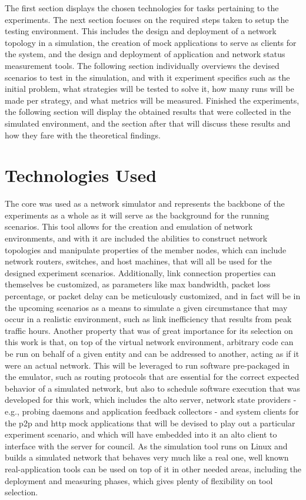     The first section displays the chosen technologies for tasks pertaining to the experiments.
    The next section focuses on the required steps taken to setup the testing environment.
    This includes the design and deployment of a network topology in a simulation, the creation of mock applications to serve as clients for the system, and the design and deployment of application and network status measurement tools.
    The following section individually overviews the devised scenarios to test in the simulation, and with it experiment specifics such as the initial problem, what strategies will be tested to solve it, how many runs will be made per strategy, and what metrics will be measured.
    Finished the experiments, the following section will display the obtained results that were collected in the simulated environment, and the section after that will discuss these results and how they fare with the theoretical findings.

\section{Technologies Used}

    The \gls{core} \cite{core} was used as a network simulator and represents the backbone of the experiments as a whole as it will serve as the background for the running scenarios.
    This tool allows for the creation and emulation of network environments, and with it are included the abilities to construct network topologies and manipulate properties of the member nodes, which can include network routers, switches, and host machines, that will all be used for the designed experiment scenarios.
    Additionally, link connection properties can themselves be customized, as parameters like max bandwidth, packet loss percentage, or packet delay can be meticulously customized, and in fact will be in the upcoming scenarios as a means to simulate a given circumstance that may occur in a realistic environment, such as link inefficiency that results from peak traffic hours.
    Another property that was of great importance for its selection on this work is that, on top of the virtual network environment, arbitrary code can be run on behalf of a given entity and can be addressed to another, acting as if it were an actual network.
    This will be leveraged to run software pre-packaged in the emulator, such as routing protocols that are essential for the correct expected behavior of a simulated network, but also to schedule software execution that was developed for this work, which includes the \gls{alto} server, network state providers - e.g., probing daemons and application feedback collectors - and system clients for the \gls{p2p} and \gls{http} mock applications that will be devised to play out a particular experiment scenario, and which will have embedded into it an \gls{alto} client to interface with the server for council.
    As the simulation tool runs on Linux and builds a simulated network that behaves very much like a real one, well known real-application tools can be used on top of it in other needed areas, including the deployment and measuring phases, which gives plenty of flexibility on tool selection.

